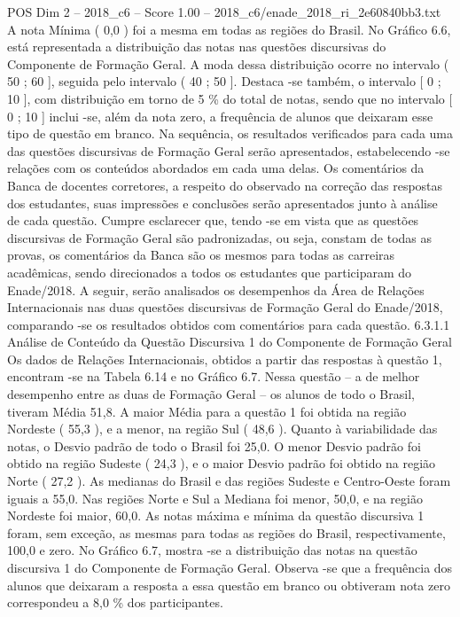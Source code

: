\begin{textsample}{POS Dim 2 – 2018\_c6 – Score 1.00 – 2018\_c6/enade\_2018\_ri\_2e60840bb3.txt}
A nota Mínima ( 0,0 ) foi a mesma em todas as regiões do Brasil.
No Gráfico 6.6, está representada a distribuição das notas nas questões discursivas do Componente de Formação Geral.
A moda dessa distribuição ocorre no intervalo ( 50 ; 60 ], seguida pelo intervalo ( 40 ; 50 ].
Destaca -se também, o intervalo [ 0 ; 10 ], com distribuição em torno de 5 \% do total de notas, sendo que no intervalo [ 0 ; 10 ] inclui -se, além da nota zero, a frequência de alunos que deixaram esse tipo de questão em branco.
Na sequência, os resultados verificados para cada uma das questões discursivas de Formação Geral serão apresentados, estabelecendo -se relações com os conteúdos abordados em cada uma delas.
Os comentários da Banca de docentes corretores, a respeito do observado na correção das respostas dos estudantes, suas impressões e conclusões serão apresentados junto à análise de cada questão.
Cumpre esclarecer que, tendo -se em vista que as questões discursivas de Formação Geral são padronizadas, ou seja, constam de todas as provas, os comentários da Banca são os mesmos para todas as carreiras acadêmicas, sendo direcionados a todos os estudantes que participaram do Enade/2018.
A seguir, serão analisados os desempenhos da Área de Relações Internacionais nas duas questões discursivas de Formação Geral do Enade/2018, comparando -se os resultados obtidos com comentários para cada questão. 6.3.1.1 Análise de Conteúdo da Questão Discursiva 1 do Componente de Formação Geral Os dados de Relações Internacionais, obtidos a partir das respostas à questão 1, encontram -se na Tabela 6.14 e no Gráfico 6.7.
Nessa questão – a de melhor desempenho entre as duas de Formação Geral – os alunos de todo o Brasil, tiveram Média 51,8.
A maior Média para a questão 1 foi obtida na região Nordeste ( 55,3 ), e a menor, na região Sul ( 48,6 ).
Quanto à variabilidade das notas, o Desvio padrão de todo o Brasil foi 25,0.
O menor Desvio padrão foi obtido na região Sudeste ( 24,3 ), e o maior Desvio padrão foi obtido na região Norte ( 27,2 ).
As medianas do Brasil e das regiões Sudeste e Centro-Oeste foram iguais a 55,0.
Nas regiões Norte e Sul a Mediana foi menor, 50,0, e na região Nordeste foi maior, 60,0.
As notas máxima e mínima da questão discursiva 1 foram, sem exceção, as mesmas para todas as regiões do Brasil, respectivamente, 100,0 e zero.
No Gráfico 6.7, mostra -se a distribuição das notas na questão discursiva 1 do Componente de Formação Geral.
Observa -se que a frequência dos alunos que deixaram a resposta a essa questão em branco ou obtiveram nota zero correspondeu a 8,0 \% dos participantes.

\end{textsample}
